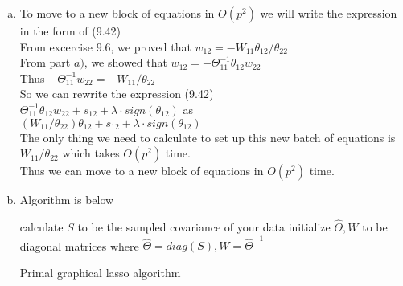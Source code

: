 \documentclass[11pt]{article}
\begin{document}
\begin{enumerate}[a)]
\item
To move to a new block of equations in $O(p^2)$ we will write the expression in the form of (9.42)\\
From excercise $9.6$, we proved that $w_{12} = -W_{11} \theta_{12} / \theta_{22}$\\
From part $a)$, we showed that $w_{12} = -\Theta_{11}^{-1} \theta_{12} w_{22}$\\
Thus $-\Theta_{11}^{-1} w_{22} = -W_{11} / \theta_{22}$\\
So we can rewrite the expression (9.42)\\
$\Theta_{11}^{-1} \theta_{12} w_{22} + s_{12} + \lambda \cdot sign(\theta_{12})$ as\\
$(W_{11} / \theta_{22})\theta_{12} + s_{12} + \lambda \cdot sign(\theta_{12})$\\
The only thing we need to calculate to set up this new batch of equations is $W_{11} / \theta_{22}$ which takes $O(p^2)$ time.\\
Thus we can move to a new block of equations in $O(p^2)$ time.

\item
Algorithm is below\\
\begin{algorithm}[H]
\SetAlgoLined
{}
 calculate $S$ to be the sampled covariance of your data\;
 initialize $\hat{\Theta}, W$ to be diagonal matrices where $\hat{\Theta} = diag(S), W = \hat{\Theta}^{-1}$\;
 \caption{Primal graphical lasso algorithm}
\end{algorithm}







\end{enumerate}
\end{document}
